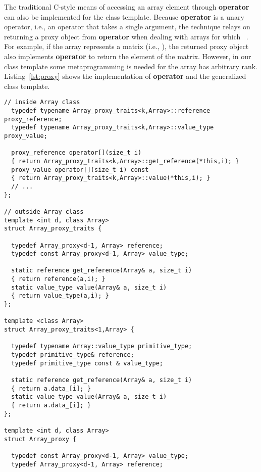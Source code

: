 \documentclass[11pt]{article}
\newcommand{\code}[1]{{\footnotesize\ttfamily{#1}}}
\newcommand\keywordd[1]{{\color{DarkOrchid}\footnotesize\ttfamily\textbf{#1}}}
\begin{document}
The traditional C-style means of accessing an array element through \keywordd{operator}\code{[]} can also be implemented for the \code{Array} class template. 
Because \keywordd{operator}\code{[]} is a unary operator, i.e., an operator that takes a single argument, the technique relays on  returning a proxy object from \keywordd{operator}\code{[]} when dealing with arrays for which \code{k>1}~\cite{Meyers:1996}. 
For example, if the array represents a matrix (i.e., \code{k=2}), the returned proxy object also implements \keywordd{operator}\code{[]} to return the element of the matrix. However, in our \code{Array} class template some metaprogramming is needed for the array has arbitrary rank. Listing~\ref{lst:proxy} shows the implementation of \keywordd{operator}\code{[]} and the generalized \code{Array\_proxy} class template.
\begin{lstlisting}[caption={Unary \code{operator[]} and proxy class template}, label=lst:proxy]
  // inside Array class
  typedef typename Array_proxy_traits<k,Array>::reference proxy_reference;
  typedef typename Array_proxy_traits<k,Array>::value_type proxy_value;
  
  proxy_reference operator[](size_t i)
  { return Array_proxy_traits<k,Array>::get_reference(*this,i); }
  proxy_value operator[](size_t i) const
  { return Array_proxy_traits<k,Array>::value(*this,i); }
  // ...
};

// outside Array class
template <int d, class Array>
struct Array_proxy_traits {
  
  typedef Array_proxy<d-1, Array> reference;
  typedef const Array_proxy<d-1, Array> value_type;
  
  static reference get_reference(Array& a, size_t i)
  { return reference(a,i); }
  static value_type value(Array& a, size_t i)
  { return value_type(a,i); }
};

template <class Array>
struct Array_proxy_traits<1,Array> {

  typedef typename Array::value_type primitive_type;
  typedef primitive_type& reference;
  typedef primitive_type const & value_type;
  
  static reference get_reference(Array& a, size_t i)
  { return a.data_[i]; }
  static value_type value(Array& a, size_t i)
  { return a.data_[i]; }
};

template <int d, class Array>
struct Array_proxy {
  
  typedef const Array_proxy<d-1, Array> value_type;
  typedef Array_proxy<d-1, Array> reference;
  

\end{lstlisting}
\end{document}
